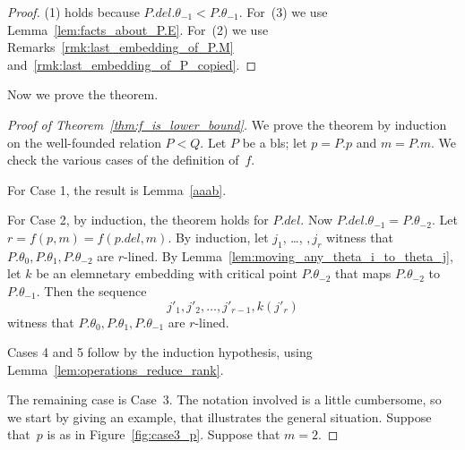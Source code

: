 \documentclass{article}
\theoremstyle{definition}
\theoremstyle{remark}
\begin{document}
\begin{proof}
  (1) holds because $P.del.\theta_{-1}< P.\theta_{-1}$. 
  For~(3) we use Lemma~\ref{lem:facts_about_P.E}. For~(2) we use Remarks~\ref{rmk:last_embedding_of_P.M} and~\ref{rmk:last_embedding_of_P_copied}. 
\end{proof}


Now we prove the theorem.

\begin{proof}[Proof of Theorem~\ref{thm:f_is_lower_bound}]
    We prove the theorem by induction on the well-founded relation $P<Q$. 
    Let $P$ be a bls; let $p = P.p$ and $m = P.m$. 
    We check the various cases of the definition of~$f$. 

    \smallskip

    For Case 1, the result is Lemma~\ref{aaab}.

    \smallskip

    For Case 2, by induction, the theorem holds for $P.del$. Now $P.del.\theta_{-1}  = P.\theta_{-2}$. Let $r= f(p,m) = f(p.del,m)$. By induction, let  $j_1$, \dots, $,j_r$ witness that $P.\theta_0,P.\theta_1,P.\theta_{-2}$ are $r$-lined. By Lemma~\ref{lem:moving_any_theta_i_to_theta_j}, let $k$ be an elemnetary embedding with critical point $P.\theta_{-2}$ that maps $P.\theta_{-2}$ to $P.\theta_{-1}$. Then the sequence 
    \[
      j'_1, j'_2,\dots, j'_{r-1}, k(j'_r)
    \]
    witness that $P.\theta_0,P.\theta_1,P.\theta_{-1}$ are $r$-lined. 

    \smallskip

    Cases 4 and 5 follow by the induction hypothesis, using Lemma~\ref{lem:operations_reduce_rank}.

    \smallskip

    The remaining case is Case~3. The notation involved is a little cumbersome, so we start by giving an example, that illustrates the general situation. Suppose that~$p$ is as in Figure~\ref{fig:case3_p}. Suppose that $m=2$. 


\end{proof}
\end{document}
